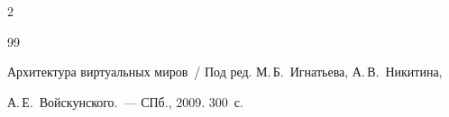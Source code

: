 \begin{multicols}{2}
{{\begin{thebibliography}{99}
























Архитектура виртуальных миров~/ Под ред. М.\,Б.~Игнатьева, А.\,В.~Никитина, 


А.\,Е.~Войскунского.~--- СПб., 2009. 300~с. 





























 












 \end{thebibliography}


}


}








\end{multicols}       


